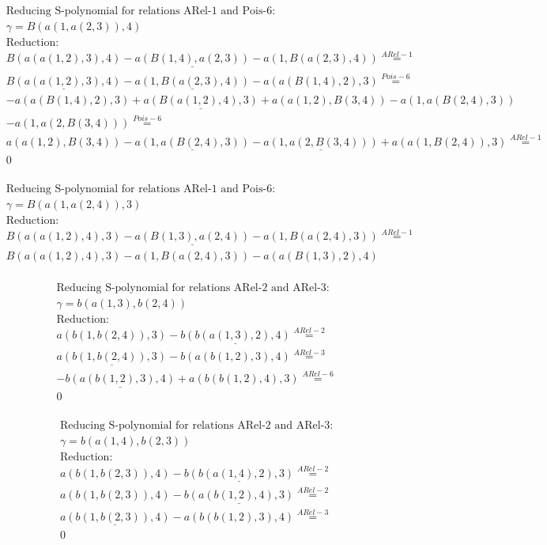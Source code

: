 \documentclass[11pt]{amsart}
\begin{document}
\begin{align*} 
& \text{Reducing S-polynomial for relations ARel-1 and Pois-6:} \\ 
& \gamma = B(a(1,a(2,3)),4) \\ 
& \text{Reduction}: \\&B(a(a(1,2),3),4) - \underline{a(B(1,4),a(2,3))} - a(1,B(a(2,3),4)) \stackrel{ ARel-1 }{=}  \\ 
&\underline{B(a(a(1,2),3),4)} - \underline{a(1,B(a(2,3),4))} - a(a(B(1,4),2),3) \stackrel{ Pois-6 }{=}  \\ 
& - a(a(B(1,4),2),3) + \underline{a(B(a(1,2),4),3)} + a(a(1,2),B(3,4)) - a(1,a(B(2,4),3))\\ 
 &  - a(1,a(2,B(3,4))) \stackrel{ Pois-6 }{=}  \\ 
&a(a(1,2),B(3,4)) - \underline{a(1,a(B(2,4),3))} - \underline{a(1,a(2,B(3,4)))} + a(a(1,B(2,4)),3) \stackrel{ ARel-1 }{=}  \\ 
&0\\ 
\end{align*} 
 
\begin{align*} 
& \text{Reducing S-polynomial for relations ARel-1 and Pois-6:} \\ 
& \gamma = B(a(1,a(2,4)),3) \\ 
& \text{Reduction}: \\&B(a(a(1,2),4),3) - \underline{a(B(1,3),a(2,4))} - a(1,B(a(2,4),3)) \stackrel{ ARel-1 }{=}  \\ 
&B(a(a(1,2),4),3) - a(1,B(a(2,4),3)) - a(a(B(1,3),2),4)\\ 
\end{align*} 
 
\begin{align*} 
& \text{Reducing S-polynomial for relations ARel-2 and ARel-3:} \\ 
& \gamma = b(a(1,3),b(2,4)) \\ 
& \text{Reduction}: \\&a(b(1,b(2,4)),3) - \underline{b(b(a(1,3),2),4)} \stackrel{ ARel-2 }{=}  \\ 
&\underline{a(b(1,b(2,4)),3)} - b(a(b(1,2),3),4) \stackrel{ ARel-3 }{=}  \\ 
& - \underline{b(a(b(1,2),3),4)} + a(b(b(1,2),4),3) \stackrel{ ARel-6 }{=}  \\ 
&0\\ 
\end{align*} 
 
\begin{align*} 
& \text{Reducing S-polynomial for relations ARel-2 and ARel-3:} \\ 
& \gamma = b(a(1,4),b(2,3)) \\ 
& \text{Reduction}: \\&a(b(1,b(2,3)),4) - \underline{b(b(a(1,4),2),3)} \stackrel{ ARel-2 }{=}  \\ 
&a(b(1,b(2,3)),4) - \underline{b(a(b(1,2),4),3)} \stackrel{ ARel-2 }{=}  \\ 
&\underline{a(b(1,b(2,3)),4)} - a(b(b(1,2),3),4) \stackrel{ ARel-3 }{=}  \\ 
&0\\ 
\end{align*} 
 
\end{document}
